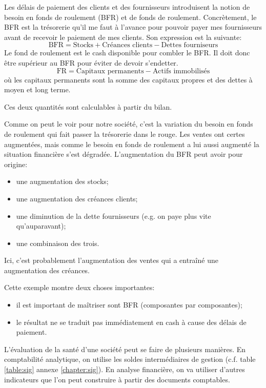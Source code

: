 Les délais de paiement des clients et des fournisseurs 
introduisent la notion de besoin en fonds de roulement (BFR) 
et de fonds de roulement. Concrètement, le BFR est la 
trésorerie qu'il me faut à l'avance pour pouvoir payer mes 
fournisseurs avant de recevoir le paiement de mes clients.
Son expression est la suivante:
\begin{equation*} \label{eq:BFR}
\mathrm{BFR} = \text{Stocks} + \text{Créances clients} - \text{Dettes fourniseurs}
\end{equation*}
Le fond de roulement est le cash disponible pour combler le 
BFR. Il doit donc être supérieur au BFR pour éviter de devoir 
s'endetter.
\[
\mathrm{FR} = \text{Capitaux permanents} - \text{Actifs immobilisés}
\]
où les capitaux permanents sont la somme des capitaux propres et des dettes à moyen et long terme.

Ces deux quantités sont calculables à partir du bilan.

Comme on peut le voir pour notre société, c'est la variation 
du besoin en fonds de roulement qui fait passer la trésorerie 
dans le rouge. Les ventes ont certes augmentées, mais comme 
le besoin en fonds de roulement a lui aussi augmenté la 
situation financière s'est dégradée. 
L'augmentation du BFR peut avoir pour origine: 
\begin{itemize}
 \item une augmentation des stocks;
 \item une augmentation des créances clients;
 \item une diminution de la dette fournisseurs (e.g. on paye plus vite qu'auparavant);
 \item une combinaison des trois.
\end{itemize}
Ici, c'est probablement l'augmentation des ventes qui a entraîné une augmentation des créances.

Cette exemple montre deux choses importantes:
\begin{itemize}
 \item il est important de maîtriser sont BFR (composantes par composantes);
 \item le résultat ne se traduit pas immédiatement en cash à cause des délais de paiement.
\end{itemize}

L'évaluation de la santé d'une société peut se faire de 
plusieurs manières. En comptabilité analytique, on utilise 
les soldes intermédiaires de gestion (c.f.\/ table \ref{table:sig} annexe \ref{chapter:sig}). 
En analyse financière, on va utiliser d'autres indicateurs que l'on peut 
construire à partir des documents comptables. 

